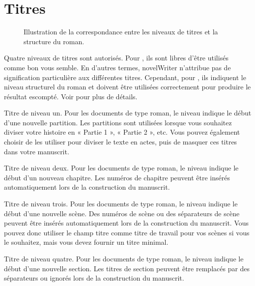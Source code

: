 \documentclass[a4paper,11pt,french]{sphinxmanual}
\begin{document}
\section{Titres}
\label{\detokenize{usage_format:headings}}\label{\detokenize{usage_format:a-fmt-head}}
\begin{figure}[htbp]
\centering
\capstart

\noindent{}
\caption{Illustration de la correspondance entre les niveaux de titres et la structure du roman.}\label{\detokenize{usage_format:id2}}\end{figure}

\sphinxAtStartPar
Quatre niveaux de titres sont autorisés. Pour {\hyperref[\detokenize{int_glossary:term-Project-Notes}]{}}, ils sont libres d’être utilisés comme bon vous semble. En d’autres termes, novelWriter n’attribue pas de signification particulière aux différentes titres. Cependant, pour {\hyperref[\detokenize{int_glossary:term-Novel-Documents}]{}}, ils indiquent le niveau structurel du roman et doivent être utilisées correctement pour produire le résultat escompté. Voir {\hyperref[\detokenize{project_structure:a-struct-heads}]{}} pour plus de détails.
\begin{description}
\sphinxAtStartPar
Titre de niveau un. Pour les documents de type roman, le niveau indique le début d’une nouvelle partition. Les partitions sont utilisées lorsque vous souhaitez diviser votre histoire en « Partie 1 », « Partie 2 », etc. Vous pouvez également choisir de les utiliser pour diviser le texte en actes, puis de masquer ces titres dans votre manuscrit.

\sphinxAtStartPar
Titre de niveau deux. Pour les documents de type roman, le niveau indique le début d’un nouveau chapitre. Les numéros de chapitre peuvent être insérés automatiquement lors de la construction du manuscrit.

\sphinxAtStartPar
Titre de niveau trois. Pour les documents de type roman, le niveau indique le début d’une nouvelle scène. Des numéros de scène ou des séparateurs de scène peuvent être insérés automatiquement lors de la construction du manuscrit. Vous pouvez donc utiliser le champ titre comme titre de travail pour vos scènes si vous le souhaitez, mais vous devez fournir un titre minimal.

\sphinxAtStartPar
Titre de niveau quatre. Pour les documents de type roman, le niveau indique le début d’une nouvelle section. Les titres de section peuvent être remplacés par des séparateurs ou ignorés lors de la construction du manuscrit.

\end{description}
\end{document}

